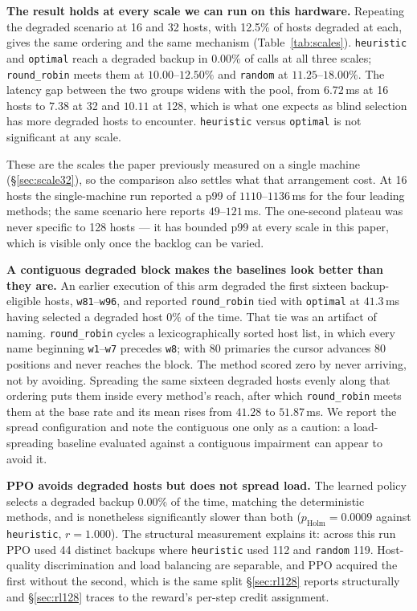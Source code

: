\textbf{The result holds at every scale we can run on this hardware.}
Repeating the degraded scenario at 16 and 32 hosts, with 12.5\% of hosts
degraded at each, gives the same ordering and the same mechanism
(Table~\ref{tab:scales}). \texttt{heuristic} and \texttt{optimal} reach a
degraded backup in $0.00\%$ of calls at all three scales; \texttt{round\_robin}
meets them at $10.00$--$12.50\%$ and \texttt{random} at $11.25$--$18.00\%$. The
latency gap between the two groups widens with the pool, from $6.72$\,ms at 16
hosts to $7.38$ at 32 and $10.11$ at 128, which is what one expects as blind
selection has more degraded hosts to encounter. \texttt{heuristic} versus
\texttt{optimal} is not significant at any scale.

These are the scales the paper previously measured on a single machine
(\S\ref{sec:scale32}), so the comparison also settles what that arrangement
cost. At 16 hosts the single-machine run reported a p99 of $1110$--$1136$\,ms
for the four leading methods; the same scenario here reports $49$--$121$\,ms.
The one-second plateau was never specific to 128 hosts --- it has bounded p99 at
every scale in this paper, which is visible only once the backlog can be varied.

\textbf{A contiguous degraded block makes the baselines look better than they
are.} An earlier execution of this arm degraded the first sixteen
backup-eligible hosts, \texttt{w81}--\texttt{w96}, and reported
\texttt{round\_robin} tied with \texttt{optimal} at $41.3$\,ms having selected a
degraded host $0\%$ of the time. That tie was an artifact of naming.
\texttt{round\_robin} cycles a lexicographically sorted host list, in which
every name beginning \texttt{w1}--\texttt{w7} precedes \texttt{w8}; with 80
primaries the cursor advances 80 positions and never reaches the block. The
method scored zero by never arriving, not by avoiding. Spreading the same
sixteen degraded hosts evenly along that ordering puts them inside every
method's reach, after which \texttt{round\_robin} meets them at the base rate
and its mean rises from $41.28$ to $51.87$\,ms. We report the spread
configuration and note the contiguous one only as a caution: a load-spreading
baseline evaluated against a contiguous impairment can appear to avoid it.

\textbf{PPO avoids degraded hosts but does not spread load.} The learned policy
selects a degraded backup $0.00\%$ of the time, matching the deterministic
methods, and is nonetheless significantly slower than both
($p_{\text{Holm}}=0.0009$ against \texttt{heuristic}, $r=1.000$). The structural
measurement explains it: across this run PPO used 44 distinct backups where
\texttt{heuristic} used 112 and \texttt{random} 119. Host-quality
discrimination and load balancing are separable, and PPO acquired the first
without the second, which is the same split \S\ref{sec:rl128} reports
structurally and \S\ref{sec:rl128} traces to the reward's per-step credit
assignment.

